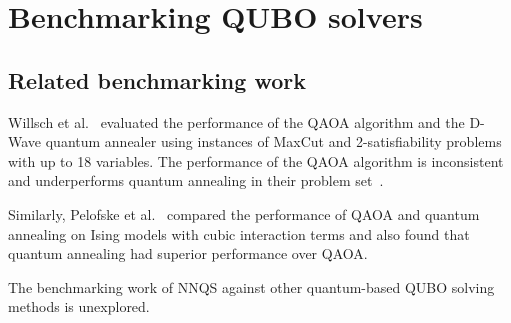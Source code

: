 \chapter{Benchmarking QUBO solvers}
\label{benchmark}

\section{Related benchmarking work}
Willsch et al.~\cite{b34} evaluated the performance of the QAOA algorithm and the D-Wave quantum annealer using instances of MaxCut and 2-satisfiability problems with up to 18 variables. The performance of the QAOA algorithm is inconsistent and underperforms quantum annealing in their problem set~\cite{b34}. 

Similarly, Pelofske et al.~\cite{b35} compared the performance of QAOA and quantum annealing on Ising models with cubic interaction terms and also found that quantum annealing had superior performance over QAOA. 

The benchmarking work of NNQS against other quantum-based QUBO solving methods is unexplored.
